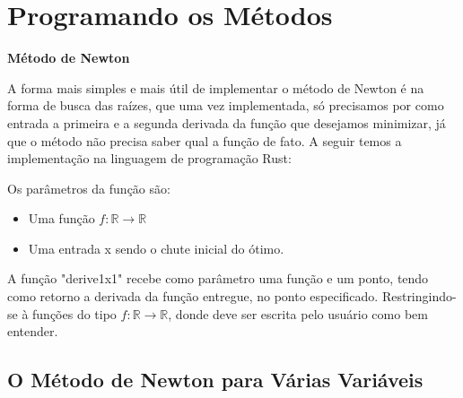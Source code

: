 \hspace{0.8cm}

\section{{Programando os Métodos}}

\hspace{0.8cm}

\textbf{Método de Newton}

A forma mais simples e mais útil de implementar o método de Newton é na forma
de busca das raízes, que uma vez  implementada, só precisamos por como entrada
a primeira e a segunda derivada da função que desejamos minimizar, já que o
método não precisa saber qual a função de fato. A seguir temos a implementação
na linguagem de programação Rust:
\vspace{0.2cm}


Os parâmetros da função são:

    \begin{itemize}
            \item Uma função \(f : \mathbb{R} \rightarrow \mathbb{R}\)
            \item Uma entrada x sendo o chute inicial do ótimo.
    \end{itemize}


A função "derive1x1" recebe como parâmetro uma função e um ponto, tendo como
retorno a derivada da função entregue, no ponto especificado. Restringindo-se
à funções do tipo \(f : \mathbb{R} \rightarrow \mathbb{R}\), donde deve ser
escrita pelo usuário como bem entender.



\textcolor[rgb]{1,0,0}{\section{{O Método de Newton para Várias Variáveis}}}
